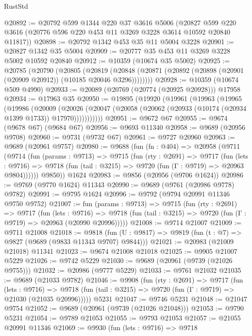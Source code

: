 \begin{lexlean}{RustStd}
\begin{coremodule}
@20892 := @20792
    @599
    @1344
    @220
    @37
    @3616
    @5006
    (@20827 @599 @220 @3616 (@20776 @596 @220 @453 @11 @3269 @3228 @3614 @10592 @20840 @11817))
@20898 := @20792 @1342 @453 @35 @11 @5004 @3228
@20901 := @20827 @1342 @35 @5004
@20909 := @20777 @35 @453 @11 @3269 @3228 @5002 @10592 @20840
@20912 := @10359 (@10674 @35 @5002)
@20925 := @20785
    (@20790
      (@20805
        (@20819
          (@20848 (@20871 (@20892 (@20898 (@20901 (@20909 @20912)) (@10185 @20046 @3296))))))))
@20928 := @10359 (@10674 @509 @4990)
@20933 := @20089 (@20769 (@20774 (@20925 @20928))) @17958
@20934 := @17963 @35
@20950 := @19895
    (@19920
      (@19961
        (@19963
          (@19965
            (@19986
              (@20009
                (@20026
                  (@20047 (@20058 (@20062 (@20933 (@10174 (@20934 @1399 @1733)) @17970)))))))))))
@20951 := @9672 @67
@20955 := @9674 (@9678 @67) (@9684 @67)
@20956 := @9693 @11340
@20958 := @9689 (@20956 @9708)
@20960 := @9731 (@9732 @67)
@20961 := @9727 @20960
@20963 := @9689 (@20961 @9757)
@20980 := @9688
    (fun (fn : @404) =>
    @20958
      (@9711
        (@9714
          (fun (params : @9713) =>
          @9715
            (fun (rty : @2691) =>
            @9717
              (fun (lets : @9716) =>
              @9718 (fun (tail : @3215) => @9720 (fun (Γ : @9719) => @20963 @9804))))))
        @9850))
    @1624
@20983 := @9856 (@20956 (@9706 @1624))
@20986 := @9769 (@9770 @1624) @11343
@20990 := @9689 (@9761 (@20986 @9778) @9782)
@20991 := @9795 @1624
@20996 := @9792 (@9794 @20991 @11346 @9750 @9752)
@21007 := fun (params : @9713) =>
  @9715
    (fun (rty : @2691) =>
    @9717
      (fun (lets : @9716) =>
      @9718 (fun (tail : @3215) => @9720 (fun (Γ : @9719) => @20963 (@20990 @20996)))))
@21008 := @9714 @21007
@21009 := @9711 @21008
@21018 := @9818
    (fun (U : @9817) => @9819 (fun (t : @7) => @9827 (@9689 (@9833 @11343 @9707) @9844)))
@21021 := @20983 (@21009 @21018) @11341
@21023 := @9674 @21008 @21018
@21025 := @9905 @21007 @5229
@21026 := @9742 @5229
@21030 := @9689 (@20961 (@9739 (@21026 @9755)))
@21032 := @20986 (@9777 @5229)
@21033 := @9761 @21032
@21035 := @9689 (@21033 @9782)
@21046 := @9908
    (fun (rty : @2691) =>
    @9717
      (fun (lets : @9716) =>
      @9718 (fun (tail : @3215) => @9720 (fun (Γ : @9719) => @21030 (@21035 @20996)))))
    @5231
@21047 := @9746 @5231
@21048 := @21047 @9754
@21052 := @9689 (@20961 (@9739 (@21026 @21048)))
@21053 := @9790 @5231
@21054 := @9789 @21053
@21055 := @9793 @21053
@21057 := @21055 @20991 @11346
@21069 := @9930
    (fun (lets : @9716) =>
    @9718

\end{coremodule}
\end{lexlean}
